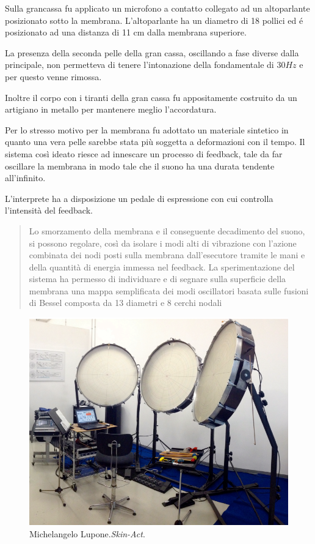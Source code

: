 Sulla grancassa fu applicato un microfono a contatto collegato ad un altoparlante
posizionato sotto la membrana.
L’altoparlante ha un diametro di 18 pollici ed é posizionato ad una distanza di
11 cm dalla membrana superiore.

La presenza della seconda pelle della gran cassa, oscillando a fase diverse
dalla principale, non permetteva di tenere l’intonazione della fondamentale di
$30Hz$ e per questo venne rimossa.

Inoltre il corpo con i tiranti della gran cassa fu appositamente costruito da un
artigiano in metallo per mantenere meglio l’accordatura.

Per lo stresso motivo per la membrana fu adottato  un materiale sintetico in
quanto una vera pelle sarebbe stata più soggetta a deformazioni con il tempo.
Il sistema così ideato riesce ad innescare un processo di feedback, tale da far
oscillare la membrana in modo tale che il suono ha una durata tendente
all’infinito.

L’interprete ha a disposizione un pedale di espressione con cui controlla
l’intensità del feedback.

\begin{quote}
Lo smorzamento della membrana e il conseguente decadimento del suono, si possono
regolare, così da isolare i modi alti di vibrazione con l’azione combinata dei
nodi posti sulla membrana dall’esecutore tramite le mani e della quantità di
energia immessa nel feedback. La sperimentazione del sistema ha permesso di
individuare e di segnare sulla superficie della membrana una mappa semplificata
dei modi oscillatori basata sulle fusioni di Bessel composta da 13 diametri e
8 cerchi nodali \cite{sl:aum}
\end{quote}

\begin{figure}%
\centering
\includegraphics[width=0.99\columnwidth]{Graphics/foto/skin-act}
\caption[]{Michelangelo Lupone.\emph{Skin-Act}.}
\label{skinact}
\end{figure}

